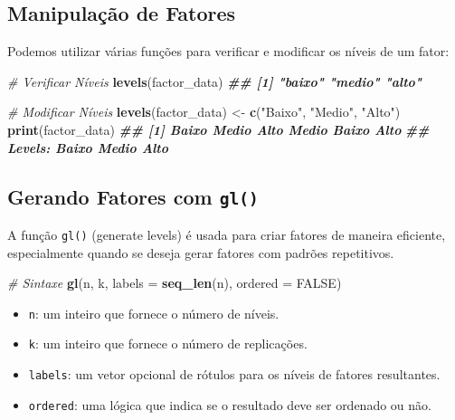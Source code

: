\documentclass[
]{book}
\newenvironment{Shaded}{\begin{snugshade}}{\end{snugshade}}
\newcommand{\AttributeTok}[1]{\textcolor[rgb]{0.13,0.29,0.53}{#1}}
\newcommand{\CommentTok}[1]{\textcolor[rgb]{0.56,0.35,0.01}{\textit{#1}}}
\newcommand{\ConstantTok}[1]{\textcolor[rgb]{0.56,0.35,0.01}{#1}}
\newcommand{\DocumentationTok}[1]{\textcolor[rgb]{0.56,0.35,0.01}{\textbf{\textit{#1}}}}
\newcommand{\FunctionTok}[1]{\textcolor[rgb]{0.13,0.29,0.53}{\textbf{#1}}}
\newcommand{\NormalTok}[1]{#1}
\newcommand{\OtherTok}[1]{\textcolor[rgb]{0.56,0.35,0.01}{#1}}
\newcommand{\StringTok}[1]{\textcolor[rgb]{0.31,0.60,0.02}{#1}}
\begin{document}
\subsection{Manipulação de Fatores}\label{manipulauxe7uxe3o-de-fatores}

Podemos utilizar várias funções para verificar e modificar os níveis de
um fator:

\begin{Shaded}
\begin{Highlighting}[]
\CommentTok{\# Verificar Níveis}
\FunctionTok{levels}\NormalTok{(factor\_data)}
\DocumentationTok{\#\# [1] "baixo"    "medio" "alto"}

\CommentTok{\# Modificar Níveis}
\FunctionTok{levels}\NormalTok{(factor\_data) }\OtherTok{\textless{}{-}} \FunctionTok{c}\NormalTok{(}\StringTok{"Baixo"}\NormalTok{, }\StringTok{"Medio"}\NormalTok{, }\StringTok{"Alto"}\NormalTok{)}
\FunctionTok{print}\NormalTok{(factor\_data)}
\DocumentationTok{\#\# [1] Baixo    Medio Alto   Medio Baixo    Alto}
\DocumentationTok{\#\# Levels: Baixo Medio Alto}
\end{Highlighting}
\end{Shaded}

\subsection{\texorpdfstring{Gerando Fatores com \texttt{gl()}}{Gerando Fatores com gl()}}\label{gerando-fatores-com-gl}

A função \texttt{gl()} (generate levels) é usada para criar fatores de maneira
eficiente, especialmente quando se deseja gerar fatores com padrões
repetitivos.

\begin{Shaded}
\begin{Highlighting}[]
\CommentTok{\# Sintaxe}
\FunctionTok{gl}\NormalTok{(n, k, }\AttributeTok{labels =} \FunctionTok{seq\_len}\NormalTok{(n), }\AttributeTok{ordered =} \ConstantTok{FALSE}\NormalTok{)}
\end{Highlighting}
\end{Shaded}

\begin{itemize}
\item
  \texttt{n}: um inteiro que fornece o número de níveis.
\item
  \texttt{k}: um inteiro que fornece o número de replicações.
\item
  \texttt{labels}: um vetor opcional de rótulos para os níveis de fatores
  resultantes.
\item
  \texttt{ordered}: uma lógica que indica se o resultado deve ser ordenado ou
  não.
\end{itemize}
\end{document}
